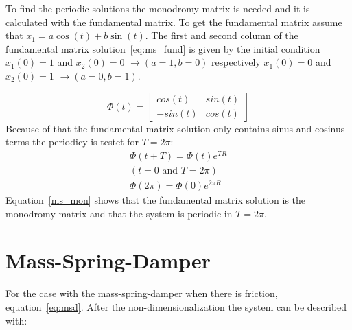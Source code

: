 \documentclass[
  twoside,
  11pt, a4paper,
  footinclude=true,
  headinclude=true,
  cleardoublepage=empty
]{scrbook}
\begin{document}
To find the periodic solutions the monodromy matrix is needed and it is calculated with the fundamental matrix. To get the fundamental matrix assume that $x_1=a\cos(t)+b\sin(t)$.  The first and second column of the fundamental matrix solution~\eqref{eq:ms_fund} is given by the initial condition $x_1(0)=1$ and $x_2(0)=0$ $\rightarrow (a=1, b=0)$ respectively $x_1(0)=0$ and $x_2(0)=1$ $\rightarrow (a=0, b=1)$.

\begin{equation}\label{eq:ms_fund}
	\Phi(t)=\begin{bmatrix}
				cos(t)	&	sin(t)\\
				-sin(t)	&	cos(t)
			\end{bmatrix}
\end{equation} 
Because of that the fundamental matrix solution only contains sinus and cosinus terms the periodicy is testet for $T=2\pi$:
\begin{equation}\label{ms_mon}
	\begin{gathered}
		\Phi(t+T)=\Phi(t) e^{TR}\\
		(t=0\text{ and }T=2\pi)\\
		\Phi(2\pi)=\Phi(0) e^{2\pi R}
	\end{gathered}
\end{equation}
Equation~\eqref{ms_mon} shows that the fundamental matrix solution is the monodromy matrix and that the system is periodic in $T=2\pi$.

\section{Mass-Spring-Damper}\label{sec:msd}
For the case with the mass-spring-damper when there is friction, equation~\eqref{eq:msd}. After the non-dimensionalization the system can be described with:
\end{document}
